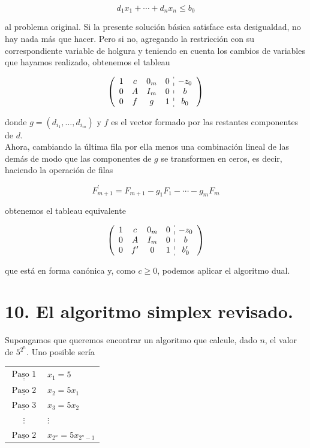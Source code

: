 \documentclass[10pt]{article}
\begin{document}
$$
d_{1} x_{1}+\cdots+d_{n} x_{n} \leq b_{0}
$$

al problema original. Si la presente solución básica satisface esta desigualdad, no hay nada más que hacer. Pero si no, agregando la restricción con su correspondiente variable de holgura y teniendo en cuenta los cambios de variables que hayamos realizado, obtenemos el tableau

$$
\left(\begin{array}{cccc:c}
1 & c & 0_{m} & 0 & -z_{0} \\
0 & A & I_{m} & 0 & b \\
0 & f & g & 1 & b_{0}
\end{array}\right)
$$

donde $g=\left(d_{i_{1}}, \ldots, d_{i_{m}}\right)$ y $f$ es el vector formado por las restantes componentes de $d$.\\
Ahora, cambiando la última fila por ella menos una combinación lineal de las demás de modo que las componentes de $g$ se transformen en ceros, es decir, haciendo la operación de filas

$$
F_{m+1}^{\prime}=F_{m+1}-g_{1} F_{1}-\cdots-g_{m} F_{m}
$$

obtenemos el tableau equivalente

$$
\left(\begin{array}{cccc:c}
1 & c & 0_{m} & 0 & -z_{0} \\
0 & A & I_{m} & 0 & b \\
0 & f^{\prime} & 0 & 1 & b_{0}^{\prime}
\end{array}\right)
$$

que está en forma canónica y, como $c \geq 0$, podemos aplicar el algoritmo dual.

\section*{10. El algoritmo simplex revisado.}
Supongamos que queremos encontrar un algoritmo que calcule, dado $n$, el valor de $5^{2^{n}}$. Uno posible sería

\begin{center}
\begin{tabular}{cl}
$\underline{\underline{\text { Paso 1 }}}$ & $x_{1}=5$ \\
$\underline{\text { Paso 2 }}$ & $x_{2}=5 x_{1}$ \\
$\underline{\text { Paso 3 }}$ & $x_{3}=5 x_{2}$ \\
$\vdots$ & $\vdots$ \\
$\underline{\text { Paso 2 }}$ & $x_{2^{n}}=5 x_{2^{n}-1}$ \\
\end{tabular}
\end{center}
\end{document}
